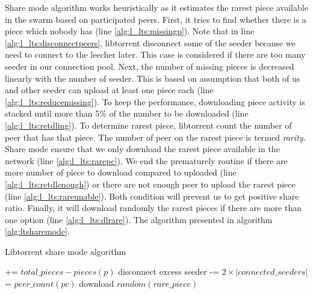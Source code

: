 Share mode algorithm works heuristically as it estimates the rarest piece available in the swarm based on participated peers. First, it tries to find whether there is a piece which nobody has (line \ref{alg:l_lts:missingp}). Note that in line \ref{alg:l_lts:disconnectpeers}, libtorrent disconnect some of the seeder because we need to connect to the leecher later. This case is considered if there are too many seeder in our connection pool. Next, the number of missing pieces is decreased linearly with the number of seeder. This is based on assumption that both of us and other seeder can upload at least one piece each (line \ref{alg:l_lts:reducemissing}). To keep the performance, downloading piece activity is stacked until more than 5\% of the number to be downloaded (line \ref{alg:l_lts:retdling}). To determine rarest piece, libtorrent count the number of peer that has that piece. The number of peer on the rarest piece is termed \textit{rarity}. Share mode ensure that we only download the rarest piece available in the network (line \ref{alg:l_lts:rarepc}). We end the prematurely routine if there are more number of piece to download compared to uploaded (line \ref{alg:l_lts:retdlenough}) or there are not enough peer to upload the rarest piece (line \ref{alg:l_lts:rareunable}). Both condition will prevent us to get positive share ratio. Finally, it will download randomly the rarest pieces if there are more than one option (line \ref{alg:l_lts:dlrare}). The algorithm presented in algorithm \ref{alg:ltsharemode}. 

\begin{algorithm}[h!]
	\caption{Libtorrent share mode algorithm}
	\label{alg:ltsharemode}
	\begin{algorithmic}[1]
		\Statex
		 += {$total\_pieces - pieces(p)$} \label{alg:l_lts:missingp}
		\EndIf	
		\EndFor
		\State disconnect excess seeder \label{alg:l_lts:disconnectpeers}
		\EndIf
		 -= {$2 \times |connected\_seeders|$}	\label{alg:l_lts:reducemissing}	
		\State \Return
		\EndIf
		 \label{alg:l_lts:retdlenough}
		\State \Return
		\EndIf
		 \label{alg:l_lts:retdling}
		\State \Return
		\EndIf
			\label{alg:l_lts:rarepc}
		 = {$peer\_count(pc)$} 
		\EndIf	
		\EndFor
		 \label{alg:l_lts:rareunable}
		\State \Return
		\EndIf
		\State download {$random(rare\_piece)$} \label{alg:l_lts:dlrare}
	\end{algorithmic}
\end{algorithm}

